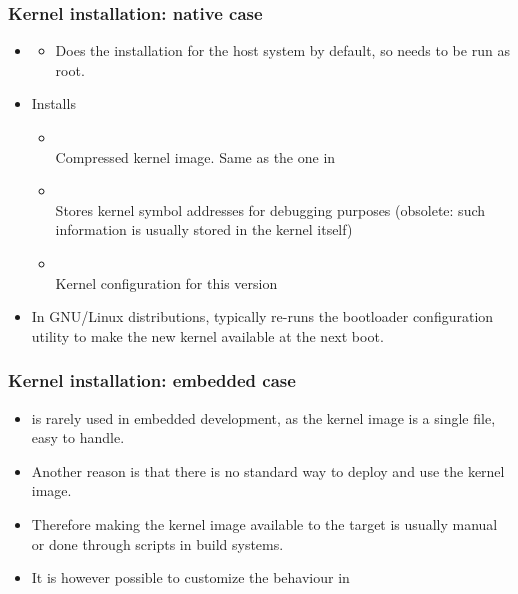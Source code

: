 \begin{frame}
  \frametitle{Kernel installation: native case}
  \begin{itemize}
  \item {}
    \begin{itemize}
    \item Does the installation for the host system by default, so
      needs to be run as root.
    \end{itemize}
  \item Installs
    \begin{itemize}
    \item {} \\
      Compressed kernel image. Same as the one in
    \item {}\\
      Stores kernel symbol addresses for debugging purposes
      (obsolete: such information is usually stored in the kernel itself)
    \item {}\\
      Kernel configuration for this version
    \end{itemize}
  \item In GNU/Linux distributions, typically re-runs the bootloader configuration
    utility to make the new kernel available at the next boot.
  \end{itemize}
\end{frame}

\begin{frame}
  \frametitle{Kernel installation: embedded case}
  \begin{itemize}
  \item {} is rarely used in embedded development, as the
    kernel image is a single file, easy to handle.
  \item Another reason is that there is no standard way to deploy and
    use the kernel image.
  \item Therefore making the kernel image available to the target is
    usually manual or done through scripts in build systems.
  \item It is however possible to customize the 
    behaviour in 
  \end{itemize}
\end{frame}

